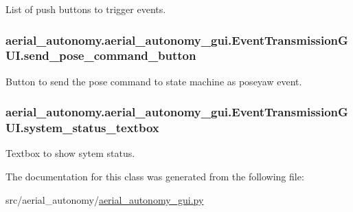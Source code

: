 List of push buttons to trigger events. 

\hypertarget{classaerial__autonomy_1_1aerial__autonomy__gui_1_1EventTransmissionGUI_aa82ebdb0e64df86776b6cd9aacecb350}{
\subsubsection[{send\-\_\-pose\-\_\-command\-\_\-button}]{\setlength{\rightskip}{0pt plus 5cm}aerial\-\_\-autonomy.\-aerial\-\_\-autonomy\-\_\-gui.\-Event\-Transmission\-G\-U\-I.\-send\-\_\-pose\-\_\-command\-\_\-button}}\label{classaerial__autonomy_1_1aerial__autonomy__gui_1_1EventTransmissionGUI_aa82ebdb0e64df86776b6cd9aacecb350}


Button to send the pose command to state machine as poseyaw event. 

\hypertarget{classaerial__autonomy_1_1aerial__autonomy__gui_1_1EventTransmissionGUI_a2e96f52dc90edde242b5387214a82858}{
\subsubsection[{system\-\_\-status\-\_\-textbox}]{\setlength{\rightskip}{0pt plus 5cm}aerial\-\_\-autonomy.\-aerial\-\_\-autonomy\-\_\-gui.\-Event\-Transmission\-G\-U\-I.\-system\-\_\-status\-\_\-textbox}}\label{classaerial__autonomy_1_1aerial__autonomy__gui_1_1EventTransmissionGUI_a2e96f52dc90edde242b5387214a82858}


Textbox to show sytem status. 



The documentation for this class was generated from the following file\-:\begin{DoxyCompactItemize}
\item 
src/aerial\-\_\-autonomy/\hyperlink{aerial__autonomy__gui_8py}{aerial\-\_\-autonomy\-\_\-gui.\-py}\end{DoxyCompactItemize}
